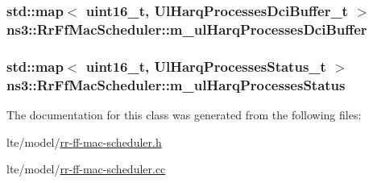 \subsubsection[{\texorpdfstring{m\+\_\+ul\+Harq\+Processes\+Dci\+Buffer}{m_ulHarqProcessesDciBuffer}}]{\setlength{\rightskip}{0pt plus 5cm}std\+::map$<$ uint16\+\_\+t, {\bf Ul\+Harq\+Processes\+Dci\+Buffer\+\_\+t} $>$ ns3\+::\+Rr\+Ff\+Mac\+Scheduler\+::m\+\_\+ul\+Harq\+Processes\+Dci\+Buffer\hspace{0.3cm}{\ttfamily [private]}}\hypertarget{classns3_1_1RrFfMacScheduler_a530849c4c8d3d5b0796e6af3d8d95173}{}\label{classns3_1_1RrFfMacScheduler_a530849c4c8d3d5b0796e6af3d8d95173}
\subsubsection[{\texorpdfstring{m\+\_\+ul\+Harq\+Processes\+Status}{m_ulHarqProcessesStatus}}]{\setlength{\rightskip}{0pt plus 5cm}std\+::map$<$ uint16\+\_\+t, {\bf Ul\+Harq\+Processes\+Status\+\_\+t} $>$ ns3\+::\+Rr\+Ff\+Mac\+Scheduler\+::m\+\_\+ul\+Harq\+Processes\+Status\hspace{0.3cm}{\ttfamily [private]}}\hypertarget{classns3_1_1RrFfMacScheduler_a13fbe24878639869771e77ff813373ff}{}\label{classns3_1_1RrFfMacScheduler_a13fbe24878639869771e77ff813373ff}


The documentation for this class was generated from the following files\+:\begin{DoxyCompactItemize}
\item 
lte/model/\hyperlink{lte_2model_2rr-ff-mac-scheduler_8h}{rr-\/ff-\/mac-\/scheduler.\+h}\item 
lte/model/\hyperlink{lte_2model_2rr-ff-mac-scheduler_8cc}{rr-\/ff-\/mac-\/scheduler.\+cc}\end{DoxyCompactItemize}
